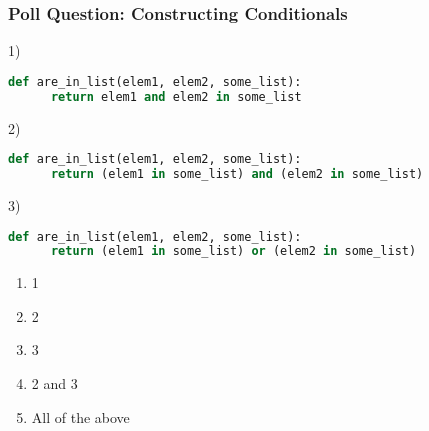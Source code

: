 \documentclass{beamer}
\begin{document}
%
%
\begin{frame}[fragile]
	\frametitle{Poll Question: Constructing Conditionals}
	\begin{minipage}{0.69\textwidth}
    1)
		\begin{lstlisting}[language=Python, autogobble,basicstyle=\tiny,numbers=none]
    def are_in_list(elem1, elem2, some_list):
      return elem1 and elem2 in some_list
		\end{lstlisting}
    \vspace{1cm}
    2)
		\begin{lstlisting}[language=Python, autogobble,basicstyle=\tiny,numbers=none]
    def are_in_list(elem1, elem2, some_list):
      return (elem1 in some_list) and (elem2 in some_list)
		\end{lstlisting}
    \vspace{1cm}
    3)
		\begin{lstlisting}[language=Python, autogobble,basicstyle=\tiny,numbers=none]
    def are_in_list(elem1, elem2, some_list):
      return (elem1 in some_list) or (elem2 in some_list)
		\end{lstlisting}
	\end{minipage}
	\begin{minipage}{0.29\textwidth}
    \begin{enumerate}[A]
      \item 1
      \item 2
      \item 3
      \item 2 and 3
      \item All of the above
    \end{enumerate}
	\end{minipage}
\end{frame}
\end{document}
